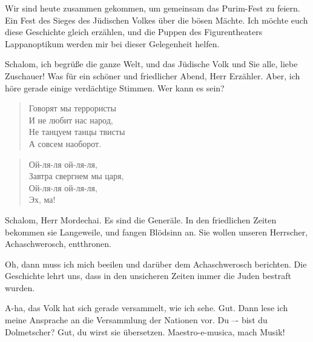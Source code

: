 \documentclass[12pt,a4paper,titlepage]{article}
\begin{document}
\begin{drama}

\uespeaks
Wir sind heute zusammen gekommen, um gemeinsam das Purim-Fest zu feiern.
Ein Fest des Sieges des Jüdischen Volkes über die bösen Mächte. Ich möchte
euch diese Geschichte gleich erzählen, und die Puppen des Figurentheaters Lappanoptikum
werden mir bei dieser Gelegenheit helfen.


\scene


\mspeaks
Schalom, ich begrüße die ganze Welt, und das Jüdische Volk und Sie alle, liebe Zuschauer!
 Was für ein schöner und friedlicher Abend, Herr Erzähler.
Aber, ich höre gerade einige verdächtige Stimmen. Wer kann es sein?


 
\begin{verse}
Говорят мы террористы\\
И не любит нас народ,\\
Не танцуем танцы твисты\\
А совсем наоборот.\\
\end{verse}

\begin{verse}
Ой-ля-ля ой-ля-ля,\\
Завтра свергнем мы царя,\\
Ой-ля-ля ой-ля-ля,\\
Эх, ма!\\
\end{verse}

\uespeaks
Schalom, Herr Mordechai. Es sind die Generäle. In den friedlichen Zeiten bekommen
sie Langeweile, und fangen Blödsinn an. Sie wollen unseren Herrscher, Achaschwerosch, entthronen.

\mspeaks {}
Oh, dann muss ich mich beeilen und darüber dem Achaschwerosch berichten.
Die Geschichte lehrt uns, dass in den unsicheren Zeiten immer die Juden bestraft wurden.



\scene


\ahspeaks {}
A-ha, das Volk hat sich gerade versammelt, wie ich sehe. Gut. Dann lese ich
meine Ansprache an die Versammlung der Nationen vor. Du –- bist du Dolmetscher?
Gut, du wirst sie übersetzen.  Maestro-e-musica, mach Musik!


\end{drama}
\end{document}

